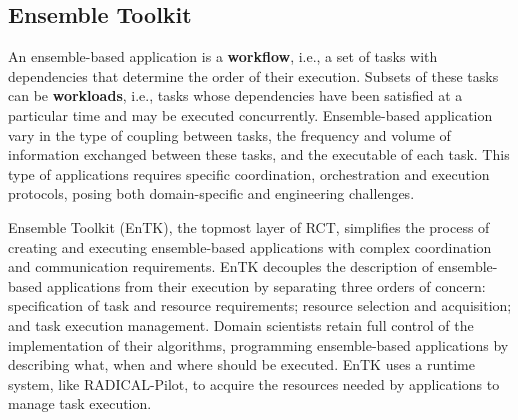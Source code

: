 \subsection{Ensemble Toolkit}

An ensemble-based application is a \textbf{workflow}, i.e., a set of tasks
with dependencies that determine the order of their execution. Subsets of
these tasks can be \textbf{workloads}, i.e., tasks whose dependencies have
been satisfied at a particular time and may be executed concurrently.
Ensemble-based application vary in the type of coupling between tasks, the
frequency and volume of information exchanged between these tasks, and the
executable of each task. This type of applications requires specific
coordination, orchestration and execution protocols, posing both
domain-specific and engineering challenges.

Ensemble Toolkit (EnTK), the topmost layer of RCT, simplifies the process of
creating and executing ensemble-based applications with complex coordination
and communication requirements. EnTK decouples the description of
ensemble-based applications from their execution by separating three orders
of concern: specification of task and resource requirements; resource
selection and acquisition; and task execution management. 
Domain scientists retain full control of the implementation of their
algorithms, programming ensemble-based applications by describing what, when
and where should be executed. EnTK uses a runtime system, like RADICAL-Pilot,
to acquire the resources needed by applications to manage task execution.



